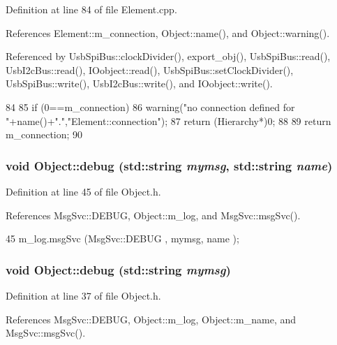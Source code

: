 Definition at line 84 of file Element.cpp.

References Element::m\_\-connection, Object::name(), and Object::warning().

Referenced by UsbSpiBus::clockDivider(), export\_\-obj(), UsbSpiBus::read(), UsbI2cBus::read(), IOobject::read(), UsbSpiBus::setClockDivider(), UsbSpiBus::write(), UsbI2cBus::write(), and IOobject::write().


\begin{DoxyCode}
84                               {
85   if (0==m_connection){
86     warning("no connection defined for "+name()+".","Element::connection");
87     return (Hierarchy*)0;
88   }
89   return m_connection;
90 }
\end{DoxyCode}
\hypertarget{classObject_a6c9a0397ca804e04d675ed05683f5420}{
\subsubsection[{debug}]{\setlength{\rightskip}{0pt plus 5cm}void Object::debug (std::string {\em mymsg}, \/  std::string {\em name})}}
\label{classObject_a6c9a0397ca804e04d675ed05683f5420}


Definition at line 45 of file Object.h.

References MsgSvc::DEBUG, Object::m\_\-log, and MsgSvc::msgSvc().


\begin{DoxyCode}
45 { m_log.msgSvc (MsgSvc::DEBUG   , mymsg, name ); }
\end{DoxyCode}
\hypertarget{classObject_aac010553f022165573714b7014a15f0d}{
\subsubsection[{debug}]{\setlength{\rightskip}{0pt plus 5cm}void Object::debug (std::string {\em mymsg})}}
\label{classObject_aac010553f022165573714b7014a15f0d}


Definition at line 37 of file Object.h.

References MsgSvc::DEBUG, Object::m\_\-log, Object::m\_\-name, and MsgSvc::msgSvc().

